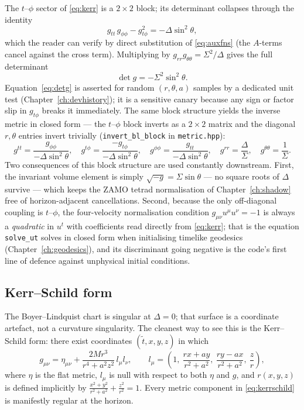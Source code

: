 The $t$--$\phi$ sector of \eqref{eq:kerr} is a $2\times2$ block; its
determinant collapses through the identity
\begin{equation}
g_{tt}\,g_{\phi\phi} - g_{t\phi}^2 = -\Delta \sin^2\theta,
\label{eq:blockdet}
\end{equation}
which the reader can verify by direct substitution of \eqref{eq:auxfns}
(the $A$-terms cancel against the cross term). Multiplying by
$g_{rr}g_{\theta\theta} = \Sigma^2/\Delta$ gives the full determinant
\begin{equation}
\det g = -\Sigma^2 \sin^2\theta .
\label{eq:detg}
\end{equation}
Equation~\eqref{eq:detg} is asserted for random $(r, \theta, a)$ samples
by a dedicated unit test (Chapter~\ref{ch:devhistory}); it is a sensitive
canary because any sign or factor slip in $g_{t\phi}$ breaks it
immediately. The same block structure yields the inverse metric in closed
form — the $t$--$\phi$ block inverts as a $2\times2$ matrix and the
diagonal $r, \theta$ entries invert trivially
(\texttt{invert\_bl\_block} in \texttt{metric.hpp}):
\begin{equation}
g^{tt} = \frac{g_{\phi\phi}}{-\Delta\sin^2\theta}, \quad
g^{t\phi} = \frac{-g_{t\phi}}{-\Delta\sin^2\theta}, \quad
g^{\phi\phi} = \frac{g_{tt}}{-\Delta\sin^2\theta}, \quad
g^{rr} = \frac{\Delta}{\Sigma}, \quad
g^{\theta\theta} = \frac{1}{\Sigma}.
\label{eq:ginv}
\end{equation}
Two consequences of this block structure are used constantly downstream.
First, the invariant volume element is simply
$\sqrt{-g} = \Sigma\sin\theta$ — no square roots of $\Delta$ survive —
which keeps the ZAMO tetrad normalisation of Chapter~\ref{ch:shadow}
free of horizon-adjacent cancellations. Second, because the only
off-diagonal coupling is $t$--$\phi$, the four-velocity normalisation
condition $g_{\mu\nu}u^\mu u^\nu = -1$ is always a \emph{quadratic} in
$u^t$ with coefficients read directly from \eqref{eq:kerr}; that is the
equation \texttt{solve\_ut} solves in closed form when initialising
timelike geodesics (Chapter~\ref{ch:geodesics}), and its discriminant
going negative is the code's first line of defence against unphysical
initial conditions.

\subsection{Kerr--Schild form}

The Boyer--Lindquist chart is singular at $\Delta = 0$; that surface is a
coordinate artefact, not a curvature singularity. The cleanest way to see
this is the Kerr--Schild form: there exist coordinates
$(\tilde t, x, y, z)$ in which
\begin{equation}
g_{\mu\nu} = \eta_{\mu\nu} + \frac{2Mr^3}{r^4 + a^2 z^2}\, l_\mu l_\nu,
\qquad
l_\mu = \left(1,\ \frac{rx + ay}{r^2+a^2},\ \frac{ry - ax}{r^2+a^2},\
\frac{z}{r}\right),
\label{eq:kerrschild}
\end{equation}
where $\eta$ is the flat metric, $l_\mu$ is null with respect to both
$\eta$ and $g$, and $r(x,y,z)$ is defined implicitly by
$\frac{x^2+y^2}{r^2+a^2} + \frac{z^2}{r^2} = 1$. Every metric component
in \eqref{eq:kerrschild} is manifestly regular at the horizon.

